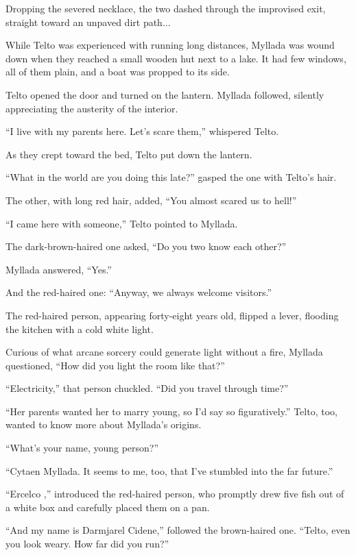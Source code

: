 Dropping the severed necklace, the two dashed through the improvised exit, straight toward an unpaved dirt path...

\centeredstars

While Telto was experienced with running long distances, Myllada was wound down when they reached a small wooden hut next to a lake. It had few windows, all of them plain, and a boat was propped to its side.

Telto opened the door and turned on the lantern. Myllada followed, silently appreciating the austerity of the interior.

``I live with my parents here. Let's scare them,'' whispered Telto.

As they crept toward the bed, Telto put down the lantern.

\centeredstars

``What in the world are you doing this late?'' gasped the one with Telto's hair.

The other, with long red hair, added, ``You almost scared us to hell!''

``I came here with someone,'' Telto pointed to Myllada.

The dark-brown-haired one asked, ``Do you two know each other?''

Myllada answered, ``Yes.''

And the red-haired one: ``Anyway, we always welcome visitors.''

The red-haired person, appearing forty-eight years old, flipped a lever, flooding the kitchen with a cold white light.

Curious of what arcane sorcery could generate light without a fire, Myllada questioned, ``How did you light the room like that?''

``Electricity,'' that person chuckled. ``Did you travel through time?''

``Her parents wanted her to marry young, so I'd say so figuratively.'' Telto, too, wanted to know more about Myllada's origins.

``What's your name, young person?''

``Cytaen Myllada. It seems to me, too, that I've stumbled into the far future.''

``Ercelco \sypros,'' introduced the red-haired person, who promptly drew five fish out of a white box and carefully placed them on a pan.

``And my name is Darmjarel Cidene,'' followed the brown-haired one. ``Telto, even you look weary. How far did you run?''

